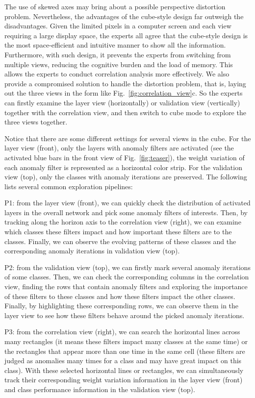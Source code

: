 \documentclass[format=acmsmall, review=false, screen=true]{acmart}
\newcommand{\ti}{\textcolor[rgb]{0,0,0}}
\begin{document}
\ti{
The use of skewed axes may bring about a possible perspective distortion problem. Nevertheless, the advantages of the cube-style design far outweigh the disadvantages.
Given the limited pixels in a computer screen and each view requiring a large display space, the experts all agree that the cube-style design is the most space-efficient and intuitive manner to show all the information. Furthermore, with such design, it prevents the experts from switching from multiple views, reducing the cognitive burden and the load of memory.
This allows the experts to conduct correlation analysis more effectively.
We also provide a compromised solution to handle the distortion problem, that is, laying out the three views in the form like Fig.~\ref{fig:correlation_view}c. So the experts can firstly examine the layer view (horizontally) or validation view (vertically) together with the correlation view, and then switch to cube mode to explore the three views together.
}\ti{
Notice that there are some different settings for several views in the cube.
For the layer view (front), only the layers with anomaly filters are activated (see the activated blue bars in the front view of  Fig.~\ref{fig:teaser}), the weight variation of each anomaly filter is represented as a horizontal color strip.
For the validation view (top), only the classes with anomaly iterations are preserved.
The following lists several common exploration pipelines:
\begin{compactitem}
	\item P1: from the layer view (front), we can quickly check the distribution of activated layers in the overall network and pick some anomaly filters of interests. Then, by tracking along the horizon axis to the correlation view (right), we can examine which classes these filters impact and how important these filters are to the classes. Finally, we can observe the evolving patterns of these classes and the corresponding anomaly iterations in validation view (top).
	\item P2: from the validation view (top), we can firstly mark several anomaly iterations of some classes. Then, we can check the corresponding columns in the correlation view, finding the rows that contain anomaly filters and exploring the importance of these filters to these classes and how these filters impact the other classes. Finally, by highlighting these corresponding rows, we can observe them in the layer view to see how these filters behave around the picked anomaly iterations.
	\item P3: from the correlation view (right), we can search the horizontal lines across many rectangles (it means these filters impact many classes at the same time) or the rectangles that appear more than one time in the same cell (these filters are judged as anomalies many times for a class and may have great impact on this class). With these selected horizontal lines or rectangles, we can simultaneously track their corresponding weight variation information in the layer view (front) and class performance information in the validation view (top).

\end{compactitem}}
\end{document}
